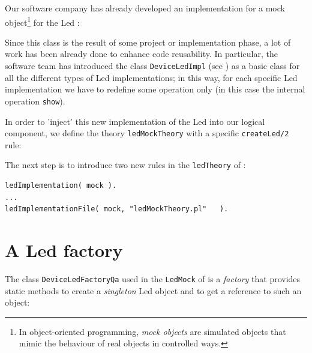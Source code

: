 Our software company has already developed an implementation for a mock object\footnote{In object-oriented programming, \textit{mock objects} are simulated objects that mimic the behaviour of real objects in controlled ways.}  for the Led :



Since this class is the result of some project or implementation phase, a lot of work has been already done to enhance code reusability. In particular, the software team has introduced the class \texttt{DeviceLedImpl} (see   ) as a basic class for all the different types of Led implementations; in this way, for each specific Led implementation we have to redefine some operation only (in this case the internal operation \texttt{show}). 

In order to 'inject' this new implementation of the Led into our logical component, we define the theory \texttt{ledMockTheory} with a specific \texttt{createLed/2} rule: 




The next step is to introduce two new rules in  the \texttt{ledTheory} of :

\begin{lstlisting}
ledImplementation( mock ).
...
ledImplementationFile( mock, "ledMockTheory.pl"   ).
\end{lstlisting}

\newpage 
\section{A Led factory }
The \java{} class \texttt{DeviceLedFactoryQa} used in the \texttt{LedMock} of  is a \textit{factory} that provides static methods to create a \textit{singleton} Led object and to get a reference to such an object:



